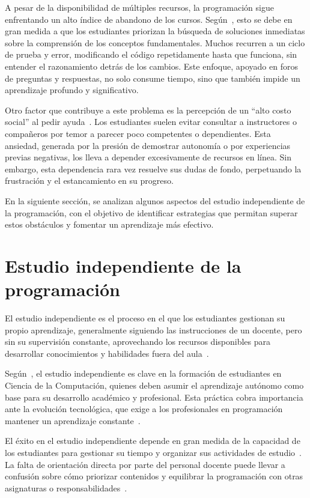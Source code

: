 A pesar de la disponibilidad de múltiples recursos, la programación sigue enfrentando un alto índice de abandono de los cursos. Según~\cite{wong2022}, esto se debe en gran medida a que los estudiantes priorizan la búsqueda de soluciones inmediatas sobre la comprensión de los conceptos fundamentales. Muchos recurren a un ciclo de prueba y error, modificando el código repetidamente hasta que funciona, sin entender el razonamiento detrás de los cambios. Este enfoque, apoyado en foros de preguntas y respuestas, no solo consume tiempo, sino que también impide un aprendizaje profundo y significativo.

Otro factor que contribuye a este problema es la percepción de un ``alto costo social'' al pedir ayuda~\cite{wong2022}. Los estudiantes suelen evitar consultar a instructores o compañeros por temor a parecer poco competentes o dependientes. Esta ansiedad, generada por la presión de demostrar autonomía o por experiencias previas negativas, los lleva a depender excesivamente de recursos en línea. Sin embargo, esta dependencia rara vez resuelve sus dudas de fondo, perpetuando la frustración y el estancamiento en su progreso.

En la siguiente sección, se analizan algunos aspectos del estudio independiente de la programación, con el objetivo de identificar estrategias que permitan superar estos obstáculos y fomentar un aprendizaje más efectivo.

\section{Estudio independiente de la programación}\label{sec:study}

El estudio independiente es el proceso en el que los estudiantes gestionan su propio aprendizaje, generalmente siguiendo las instrucciones de un docente, pero sin su supervisión constante, aprovechando los recursos disponibles para desarrollar conocimientos y habilidades fuera del aula~\cite{proskuraLytvynova2020}.

Según~\cite{proskuraLytvynova2020}, el estudio independiente es clave en la formación de estudiantes en Ciencia de la Computación, quienes deben asumir el aprendizaje autónomo como base para su desarrollo académico y profesional. Esta práctica cobra importancia ante la evolución tecnológica, que exige a los profesionales en programación mantener un aprendizaje constante~\cite{proskuraLytvynova2020}.

El éxito en el estudio independiente depende en gran medida de la capacidad de los estudiantes para gestionar su tiempo y organizar sus actividades de estudio~\cite{overklift2019}. La falta de orientación directa por parte del personal docente puede llevar a confusión sobre cómo priorizar contenidos y equilibrar la programación con otras asignaturas o responsabilidades~\cite{proskuraLytvynova2020}. 

